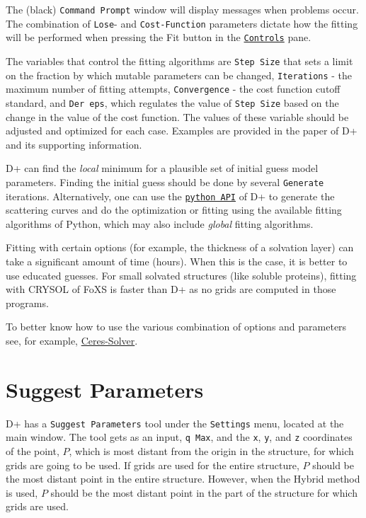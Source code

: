 \documentclass[../D+Manual.tex]{subfiles}
\begin{document}
The (black) \texttt {Command Prompt} window will display messages when problems occur. The combination of \texttt{Lose}- and \texttt{Cost-Function} parameters dictate how the fitting will be performed when pressing the Fit button in the \hyperref[sec:controls]{\texttt{Controls}} pane.

The variables that control the fitting algorithms are \texttt{Step Size} that sets a limit on the fraction by which mutable parameters can be changed, \texttt{Iterations} - the maximum number of fitting attempts, \texttt{Convergence} - the cost function cutoff standard, and \texttt{Der eps}, which regulates the value of \texttt{Step Size} based on the change in the value of the cost function. The values of these variable should be adjusted and optimized for each case. Examples are provided in the paper of D+ and its supporting information. 

D+ can find the \textit{local} minimum for a plausible set of initial guess model parameters. Finding the initial guess should be done by several \texttt{Generate} iterations.
Alternatively, one can use the \hyperref[python-fitting]{\texttt{python API}} of D+ to generate the scattering curves and do the optimization or fitting using the available fitting algorithms of  Python, which may also include \textit{global} fitting algorithms. 

Fitting with certain options (for example, the thickness of a solvation layer) can take a significant amount of time (hours). When this is the case, it is better to use educated guesses. For small solvated structures (like soluble proteins), fitting with CRYSOL of FoXS is faster than D+ as no grids are computed in those programs.

To better know how to use the various combination of options and parameters see, for example,  \href{http://ceres-solver.org/}{Ceres-Solver}.


\section{Suggest Parameters}
\label{SugPar}
D+ has a \texttt{Suggest Parameters} tool under the \texttt{Settings} menu, located at the main window.
The tool gets as an input, \texttt{q Max}, and the \texttt{x}, \texttt{y}, and \texttt{z} coordinates of the point, $P$, which is most distant from the origin in the structure, for which grids are going to be used. 
If grids are used for the entire structure, $P$  should be the most distant point in the entire structure. However, when the Hybrid method is used, $P$ should be the most distant point in the part of the structure for which grids are used.  
\end{document}
